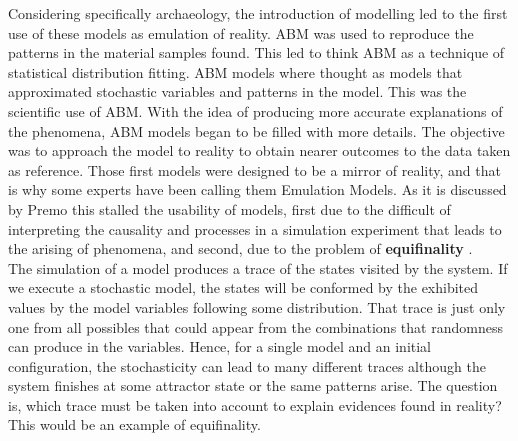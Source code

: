 \documentclass[11pt,oneside,a4paper,openright]{report}
\begin{document}
Considering specifically archaeology, the introduction of modelling led to the first use of these models as emulation of reality. ABM was used to reproduce the patterns in the material samples found. This led to think ABM as a technique
of statistical distribution fitting. ABM models where thought as models that approximated stochastic variables and patterns in the model. This was the scientific use of ABM. With the idea of producing more accurate explanations of the phenomena, ABM models began to be filled with more details. The objective was to approach the model to reality to obtain nearer outcomes to the data taken as reference. Those first models were designed to be a mirror of reality, and that is why some experts have been calling them Emulation Models. As it is discussed by Premo \cite[p.33]{Premo2010} this stalled the usability of models, first due to the difficult of interpreting the causality and processes in a simulation experiment that leads to the arising of phenomena, and second, due to the problem of \textbf{equifinality} \cite[p.31]{Premo2010}.\\
The simulation of a model produces a trace of the states visited by the system. If we execute a stochastic model, the states will be conformed by the exhibited values by the model variables following some distribution. That trace is just only one from all possibles that could appear from the combinations that randomness can produce in the variables. Hence, for a single model and an initial configuration, the stochasticity can lead to many different traces although the system finishes at some attractor state or the same patterns arise. The question is, which trace must be taken into account to explain evidences found in reality? This would be an example of equifinality.\\ 
%
\end{document}
